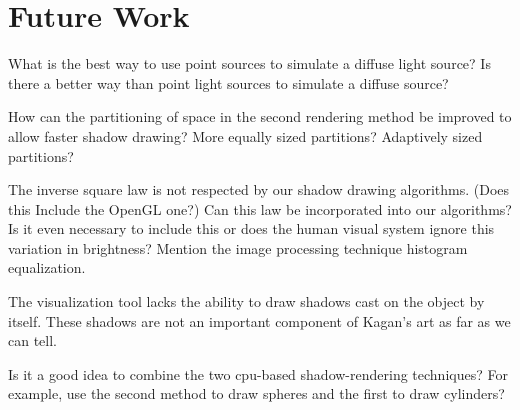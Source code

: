 \documentclass[10pt]{article}
\begin{document}
\section{Future Work}
What is the best way to use point sources to simulate a diffuse light source? Is there a better way than point light sources to simulate a diffuse source?

How can the partitioning of space in the second rendering method be improved to allow faster shadow drawing? More equally sized partitions? Adaptively sized partitions?

The inverse square law is not respected by our shadow drawing algorithms. (Does this Include the OpenGL one?) Can this law be incorporated into our algorithms? Is it even necessary to include this or does the human visual system ignore this variation in brightness? Mention the image processing technique histogram equalization.

The visualization tool lacks the ability to draw shadows cast on the object by itself. These shadows are not an important component of Kagan's art as far as we can tell.

Is it a good idea to combine the two cpu-based shadow-rendering techniques? For example, use the second method to draw spheres and the first to draw cylinders?
\end{document}

